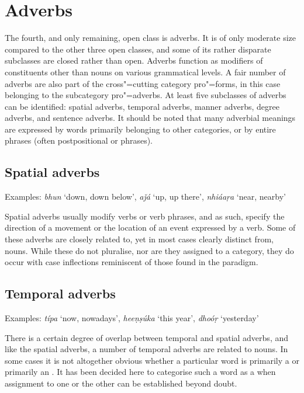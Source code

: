 \section{Adverbs}
\label{sec:3b-5}
The fourth, and only remaining, open class is adverbs. It is of only moderate size compared to the other three open classes, and some of its rather disparate subclasses are closed rather than open. Adverbs function as modifiers of constituents other than nouns on various grammatical levels. A fair number of adverbs are also part of the cross"=cutting category pro"=forms, in this case belonging to the subcategory pro"=adverbs. At least five subclasses of adverbs can be identified: spatial adverbs, temporal adverbs, manner adverbs, degree adverbs, and sentence adverbs. It should be noted that many adverbial meanings are expressed by words primarily belonging to other categories, or by entire phrases (often postpositional or  phrases).


\subsection{Spatial adverbs}
\label{subsec:3b-5-1}
Examples: \textit{bhun} `down, down below', \textit{aǰá} `up, up there', \textit{nhiáaṛa} `near, nearby'


Spatial adverbs usually modify verbs or verb phrases, and as such, specify the direction of a movement or the location of an event expressed by a verb. Some of these adverbs are closely related to, yet in most cases clearly distinct from, nouns. While these do not pluralise, nor are they assigned to a  category, they do occur with case inflections reminiscent of those found in the  paradigm. 


\subsection{Temporal adverbs}
\label{subsec:3b-5-2}
Examples: \textit{típa} `now, nowadays', \textit{heeṇṣúka} `this year', \textit{dhoóṛ} `yesterday'


There is a certain degree of overlap between temporal and spatial adverbs, and like the spatial adverbs, a number of temporal adverbs are related to nouns. In some cases it is not altogether obvious whether a particular word is primarily a  or primarily an . It has been decided here to categorise such a word as a  when assignment to one or the other  can be established beyond doubt.


